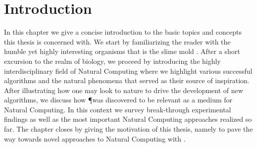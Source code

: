 \chapter{Introduction}

In this chapter we give a concise introduction to the basic topics and concepts this thesis is concerned with. We start by familiarizing the reader with the humble yet highly interesting organisms that is the slime mold \Pp. After a short excursion to the realm of biology, we proceed by introducing the highly interdisciplinary field of Natural Computing where we highlight various successful algorithms and the natural phenomena that served as their source of inspiration. After illustrating how one may look to nature to drive the development of new algorithms, we discuss how \P was discovered to be relevant as a medium for Natural Computing. In this context we survey break-through experimental findings as well as the most important Natural Computing approaches realized so far. The chapter closes by giving the motivation of this thesis, namely to pave the way towards novel approaches to Natural Computing with \Pp.







